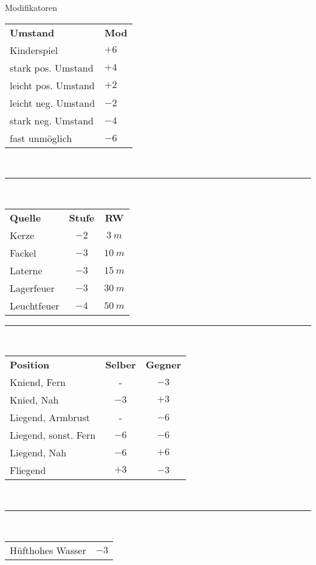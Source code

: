 \documentclass[a4paper, 11pt]{article}
\begin{document}
\begin{multicols}{3}
\begin{spmbox}{Modifikatoren}
\begin{tabularx}{\linewidth}{X X}
                \textbf{Umstand} & \textbf{Mod}\\
                Kinderspiel &   $+6$\\
                stark pos. Umstand & $+4$\\
                leicht pos. Umstand & $+2$\\
                leicht neg. Umstand & $-2$\\
                stark neg. Umstand & $-4$\\
                fast unmöglich & $-6$\\
        \end{tabularx}\\
        \rule{\linewidth}{.2em}\\
        \begin{tabularx}{\linewidth}{X c c}
                \rowcolor{spmtabelle2}
            \textbf{Quelle} & \textbf{Stufe} & \textbf{RW} \\
            Kerze & $-2$ & $3~m$ \\
            Fackel & $-3$ & $10~m$  \\
              Laterne  & $-3$ & $15~m$  \\
              Lagerfeuer & $-3$ & $30~m$  \\
              Leuchtfeuer & $-4$ & $50~m$  \\
        \end{tabularx}
        \rule{\linewidth}{.2em}\\
        \begin{tabularx}{\linewidth}{X c c}
                \rowcolor{spmtabelle2}
                \textbf{Position} & \textbf{Selber} & \textbf{Gegner}\\
                Kniend, Fern & - & $-3$ \\
                Knied, Nah & $-3$ & $+3$ \\
                Liegend, Armbrust & - & $-6$ \\
                Liegend, sonst. Fern & $-6$ & $-6$ \\
                Liegend, Nah & $-6$ & $+6$ \\
                Fliegend & $+3$ & $-3$ \\ 
        \end{tabularx}\\
        \rule{\linewidth}{.2em}\\
        \begin{tabularx}{\linewidth}{X c}
                Hüfthohes Wasser & $-3$\\

\end{tabularx}
\end{spmbox}
\end{multicols}
\end{document}
